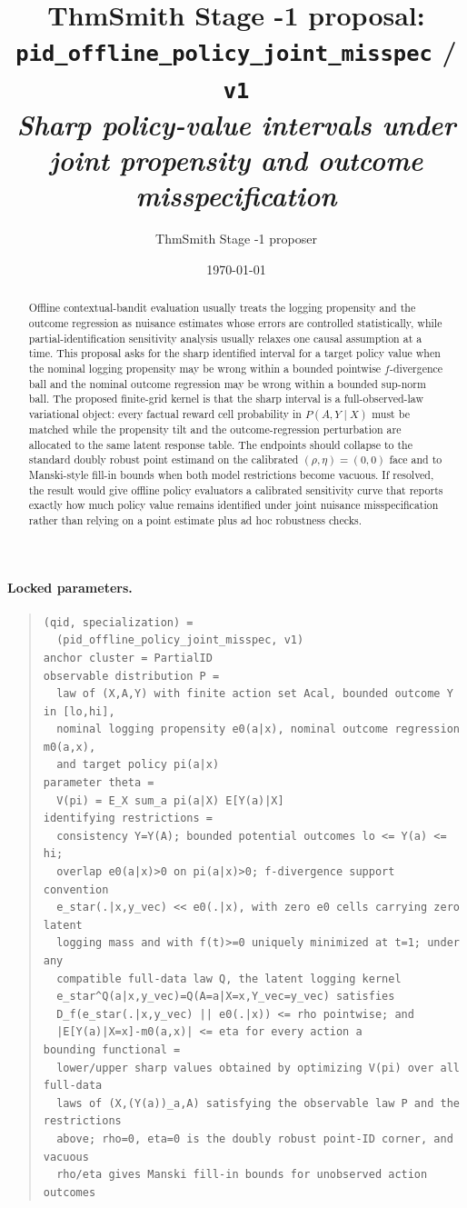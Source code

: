 \documentclass[11pt]{article}
\title{ThmSmith Stage -1 proposal: \texttt{pid\_offline\_policy\_joint\_misspec} / \texttt{v1}%
  \\ \large\textit{Sharp policy-value intervals under joint propensity and outcome misspecification}}
\author{ThmSmith Stage -1 proposer}
\date{\today}
\theoremstyle{definition}
\theoremstyle{plain}
\theoremstyle{remark}
\begin{document}
\maketitle


\paragraph{Locked parameters.}
\begin{quote}\small
\begin{verbatim}
(qid, specialization) =
  (pid_offline_policy_joint_misspec, v1)
anchor cluster = PartialID
observable distribution P =
  law of (X,A,Y) with finite action set Acal, bounded outcome Y in [lo,hi],
  nominal logging propensity e0(a|x), nominal outcome regression m0(a,x),
  and target policy pi(a|x)
parameter theta =
  V(pi) = E_X sum_a pi(a|X) E[Y(a)|X]
identifying restrictions =
  consistency Y=Y(A); bounded potential outcomes lo <= Y(a) <= hi;
  overlap e0(a|x)>0 on pi(a|x)>0; f-divergence support convention
  e_star(.|x,y_vec) << e0(.|x), with zero e0 cells carrying zero latent
  logging mass and with f(t)>=0 uniquely minimized at t=1; under any
  compatible full-data law Q, the latent logging kernel
  e_star^Q(a|x,y_vec)=Q(A=a|X=x,Y_vec=y_vec) satisfies
  D_f(e_star(.|x,y_vec) || e0(.|x)) <= rho pointwise; and
  |E[Y(a)|X=x]-m0(a,x)| <= eta for every action a
bounding functional =
  lower/upper sharp values obtained by optimizing V(pi) over all full-data
  laws of (X,(Y(a))_a,A) satisfying the observable law P and the restrictions
  above; rho=0, eta=0 is the doubly robust point-ID corner, and vacuous
  rho/eta gives Manski fill-in bounds for unobserved action outcomes
\end{verbatim}
\end{quote}

\begin{abstract}
Offline contextual-bandit evaluation usually treats the logging propensity and the outcome regression as nuisance estimates whose errors are controlled statistically, while partial-identification sensitivity analysis usually relaxes one causal assumption at a time. This proposal asks for the sharp identified interval for a target policy value when the nominal logging propensity may be wrong within a bounded pointwise $f$-divergence ball and the nominal outcome regression may be wrong within a bounded sup-norm ball. The proposed finite-grid kernel is that the sharp interval is a full-observed-law variational object: every factual reward cell probability in $P(A,Y\mid X)$ must be matched while the propensity tilt and the outcome-regression perturbation are allocated to the same latent response table. The endpoints should collapse to the standard doubly robust point estimand on the calibrated $(\rho,\eta)=(0,0)$ face and to Manski-style fill-in bounds when both model restrictions become vacuous. If resolved, the result would give offline policy evaluators a calibrated sensitivity curve that reports exactly how much policy value remains identified under joint nuisance misspecification rather than relying on a point estimate plus ad hoc robustness checks.
\end{abstract}
\end{document}

